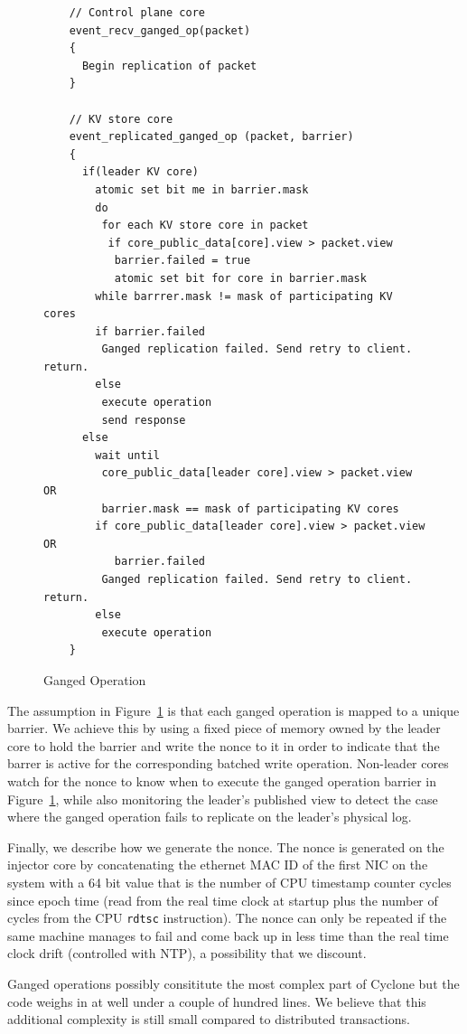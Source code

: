 \documentclass[pageno]{jpaper}
\begin{document}
\begin{figure}
  \centering
\begin{verbatim}
    // Control plane core
    event_recv_ganged_op(packet)
    {
      Begin replication of packet
    }

    // KV store core
    event_replicated_ganged_op (packet, barrier)
    {
      if(leader KV core)
        atomic set bit me in barrier.mask         
        do
         for each KV store core in packet
          if core_public_data[core].view > packet.view
           barrier.failed = true 
           atomic set bit for core in barrier.mask
        while barrrer.mask != mask of participating KV cores
        if barrier.failed
         Ganged replication failed. Send retry to client. return.
        else       
         execute operation
         send response
      else
        wait until 
         core_public_data[leader core].view > packet.view OR
         barrier.mask == mask of participating KV cores
        if core_public_data[leader core].view > packet.view OR
           barrier.failed
         Ganged replication failed. Send retry to client. return.
        else
         execute operation
    }
\end{verbatim}
\caption{Ganged Operation}
\label{fig:ganged_ops}
\end{figure}

The assumption in Figure~\ref{fig:ganged_ops} is that each ganged operation is
mapped to a unique barrier. We achieve this by using a fixed piece of memory
owned by the leader core to hold the barrier and write the nonce to it in order
to indicate that the barrer is active for the corresponding batched write
operation. Non-leader cores watch for the nonce to know when to execute the
ganged operation barrier in Figure~\ref{fig:ganged_ops}, while also monitoring
the leader's published view to detect the case where the ganged operation fails
to replicate on the leader's physical log.

Finally, we describe how we generate the nonce. The nonce is generated on the
injector core by concatenating the ethernet MAC ID of the first NIC on the
system with a 64 bit value that is the number of CPU timestamp counter cycles
since epoch time (read from the real time clock at startup plus the number of
cycles from the CPU {\tt rdtsc} instruction). The nonce can only be repeated if
the same machine manages to fail and come back up in less time than the real
time clock drift (controlled with NTP), a possibility that we discount.

Ganged operations possibly consititute the most complex part of Cyclone but the
code weighs in at well under a couple of hundred lines. We believe that
this additional complexity is still small compared to distributed transactions.
\end{document}
